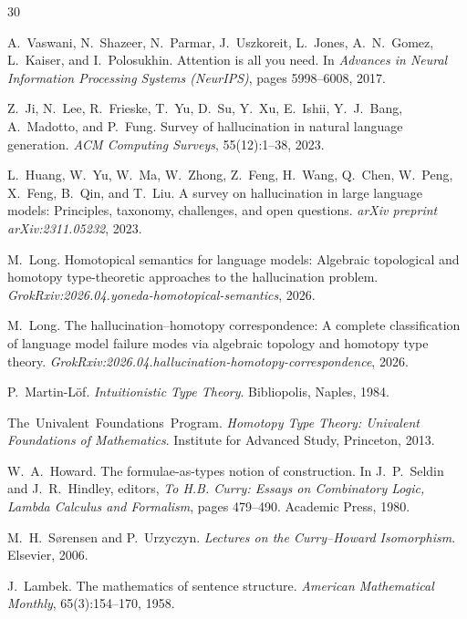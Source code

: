 \documentclass[11pt,a4paper]{article}
\theoremstyle{plain}
\theoremstyle{definition}
\theoremstyle{remark}
\begin{document}
\begin{thebibliography}{30}

A.~Vaswani, N.~Shazeer, N.~Parmar, J.~Uszkoreit, L.~Jones, A.~N.~Gomez, L.~Kaiser, and I.~Polosukhin.
\newblock Attention is all you need.
\newblock In \emph{Advances in Neural Information Processing Systems (NeurIPS)}, pages 5998--6008, 2017.

Z.~Ji, N.~Lee, R.~Frieske, T.~Yu, D.~Su, Y.~Xu, E.~Ishii, Y.~J.~Bang, A.~Madotto, and P.~Fung.
\newblock Survey of hallucination in natural language generation.
\newblock \emph{ACM Computing Surveys}, 55(12):1--38, 2023.

L.~Huang, W.~Yu, W.~Ma, W.~Zhong, Z.~Feng, H.~Wang, Q.~Chen, W.~Peng, X.~Feng, B.~Qin, and T.~Liu.
\newblock A survey on hallucination in large language models: Principles, taxonomy, challenges, and open questions.
\newblock \emph{arXiv preprint arXiv:2311.05232}, 2023.

M.~Long.
\newblock Homotopical semantics for language models: Algebraic topological and homotopy type-theoretic approaches to the hallucination problem.
\newblock \emph{GrokRxiv:2026.04.yoneda-homotopical-semantics}, 2026.

M.~Long.
\newblock The hallucination--homotopy correspondence: A complete classification of language model failure modes via algebraic topology and homotopy type theory.
\newblock \emph{GrokRxiv:2026.04.hallucination-homotopy-correspondence}, 2026.

P.~Martin-L\"{o}f.
\newblock \emph{Intuitionistic Type Theory}.
\newblock Bibliopolis, Naples, 1984.

The~Univalent~Foundations~Program.
\newblock \emph{Homotopy Type Theory: Univalent Foundations of Mathematics}.
\newblock Institute for Advanced Study, Princeton, 2013.

W.~A.~Howard.
\newblock The formulae-as-types notion of construction.
\newblock In J.~P.~Seldin and J.~R.~Hindley, editors, \emph{To H.B. Curry: Essays on Combinatory Logic, Lambda Calculus and Formalism}, pages 479--490. Academic Press, 1980.

M.~H.~S{\o}rensen and P.~Urzyczyn.
\newblock \emph{Lectures on the Curry--Howard Isomorphism}.
\newblock Elsevier, 2006.

J.~Lambek.
\newblock The mathematics of sentence structure.
\newblock \emph{American Mathematical Monthly}, 65(3):154--170, 1958.


\end{thebibliography}
\end{document}
